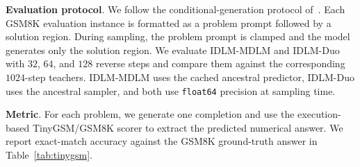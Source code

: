 \noindent \textbf{Evaluation protocol}.
We follow the conditional-generation protocol of~\citet{deschenaux2026language}. Each GSM8K evaluation instance is formatted as a problem prompt followed by a solution region. During sampling, the problem prompt is clamped and the model generates only the solution region. We evaluate IDLM-MDLM and IDLM-Duo with $32$, $64$, and $128$ reverse steps and compare them against the corresponding $1024$-step teachers. IDLM-MDLM uses the cached ancestral predictor, IDLM-Duo uses the ancestral sampler, and both use \texttt{float64} precision at sampling time.

\noindent \textbf{Metric}.
For each problem, we generate one completion and use the execution-based TinyGSM/GSM8K scorer to extract the predicted numerical answer. We report exact-match accuracy against the GSM8K ground-truth answer in Table~\ref{tab:tinygsm}.
